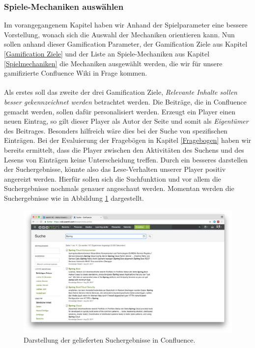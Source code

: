 \documentclass[a4paper,12pt,twoside]{scrartcl}
\begin{document}
\subsubsection{Spiele-Mechaniken auswählen}
Im vorangegangenem Kapitel haben wir Anhand der Spielparameter eine bessere Vorstellung, wonach sich die Auswahl der Mechaniken orientieren kann. Nun sollen anhand dieser Gamification Parameter, der Gamification Ziele aus Kapitel \ref{Gamification Ziele} und der Liste an Spiele-Mechaniken aus Kapitel \ref{Spielmechaniken} die Mechaniken ausgewählt werden, die wir für unsere gamifizierte Confluence Wiki in Frage kommen. 
\\\\
Als erstes soll das zweite der drei Gamification Ziele, \textit{Relevante Inhalte sollen besser gekennzeichnet werden} betrachtet werden. Die Beiträge, die in Confluence gemacht werden, sollen dafür personalisiert werden. Erzeugt ein Player einen neuen Eintrag, so gilt dieser Player als Autor der Seite und somit als \textit{Eigentümer} des Beitrages. Besonders hilfreich wäre dies bei der Suche von spezifischen Einträgen. Bei der Evaluierung der Fragebögen in Kapitel \ref{Fragebogen} haben wir bereits ermittelt, dass die Player zwischen den Aktivitäten des Suchens und des Lesens von Einträgen keine Unterscheidung treffen. Durch ein besseres darstellen der Suchergebnisse, könnte also das Lese-Verhalten unserer Player positiv angereizt werden. Hierfür sollen sich die Suchfunktion und vor allem die Suchergebnisse nochmals genauer angeschaut werden. Momentan werden die Suchergebnisse wie in Abbildung \ref{Suchergebnisse} dargestellt.   
\\
\begin{figure}[h!]
\begin{center}
\includegraphics[scale = 0.1]{Bilder/Suchergebnisse.png}
\caption{Darstellung der gelieferten Suchergebnisse in Confluence.}
\label{Suchergebnisse}
\end{center}
\end{figure}
\end{document}
